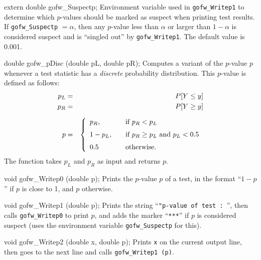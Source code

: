 extern double gofw_Suspectp;
\endcode
 \tab  Environment variable used in {\tt gofw\_Writep1} to determine
   which $p$-values should be marked as suspect when printing test results.
   If {\tt gofw\_Suspectp} $= \alpha$, then any $p$-value
   less than $\alpha$ or larger than
   $1-\alpha$ is considered suspect and is
   ``singled out'' by {\tt gofw\_Writep1}.
   The default value is 0.001.
 \endtab
\code


double gofw_pDisc (double pL, double pR);
\endcode
\tab  Computes a variant of the $p$-value $p$ whenever a test statistic
  has a {\em discrete\/} probability distribution.
  This $p$-value is defined as follows: 
  \begin{eqnarray*}
    p_L & = & P[Y \le y] \\
    p_R & = & P[Y \ge y] \\[6pt]
    p & = & \left\{ \begin{array}{l@{\qquad}l}
        p_R, & \mbox{if } p_R <  p_L \\[6pt]
     1 - p_L, & \mbox{if }
            p_R \ge p_L \mbox{ and }  p_L < 0.5 \\[6pt]
              0.5  &         \mbox{otherwise.}
                    \end{array}  \right.
  \end{eqnarray*} 
  The function takes $p_L$ and $p_R$ as input and returns $p$.
\endtab
\code


void gofw_Writep0 (double p);
\endcode
\tab  Prints the $p$-value $p$ of a test, 
   in the format ``$1-p$'' if $p$ is close to 1, and $p$ otherwise.
\endtab
\code


void gofw_Writep1 (double p);
\endcode
\tab  Prints the string ``{\tt "p-value of test : }'',
  then calls {\tt gofw\_Writep0} to print $p$, and adds
  the marker ``{\tt ****}'' if $p$ is considered suspect
  (uses the environment variable {\tt gofw\_Suspectp} for this).
\endtab
\code


void gofw_Writep2 (double x, double p);
\endcode
\tab  Prints {\tt x} on the current output line, then goes to the next line
   and calls {\tt gofw\_Writep1 (p)}.
\endtab
\code


